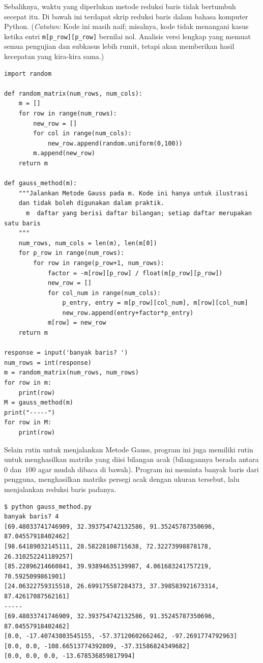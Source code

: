 Sebaliknya, waktu yang diperlukan metode reduksi baris tidak bertumbuh secepat itu.
Di bawah ini terdapat skrip reduksi baris dalam bahasa komputer Python.
(\textit{Catatan:}
Kode ini masih naif; misalnya, kode tidak menangani kasus ketika entri
\lstinline[style=inline]!m[p_row][p_row]! bernilai nol.
Analisis versi lengkap yang memuat semua pengujian dan subkasus lebih rumit,
tetapi akan memberikan hasil kecepatan yang kira-kira sama.)
\begin{lstlisting}
import random

def random_matrix(num_rows, num_cols):
    m = []
    for row in range(num_rows):
        new_row = []
        for col in range(num_cols):
            new_row.append(random.uniform(0,100))
        m.append(new_row)
    return m

def gauss_method(m):
    """Jalankan Metode Gauss pada m. Kode ini hanya untuk ilustrasi
    dan tidak boleh digunakan dalam praktik.
      m  daftar yang berisi daftar bilangan; setiap daftar merupakan satu baris
    """
    num_rows, num_cols = len(m), len(m[0])
    for p_row in range(num_rows):
        for row in range(p_row+1, num_rows):
            factor = -m[row][p_row] / float(m[p_row][p_row])
            new_row = []
            for col_num in range(num_cols): 
                p_entry, entry = m[p_row][col_num], m[row][col_num]
                new_row.append(entry+factor*p_entry)
            m[row] = new_row
    return m

response = input('banyak baris? ')
num_rows = int(response)
m = random_matrix(num_rows, num_rows)
for row in m:
    print(row)
M = gauss_method(m)
print("-----")
for row in M:
    print(row)
\end{lstlisting}
Selain rutin untuk menjalankan Metode Gauss, program ini juga memiliki rutin
untuk menghasilkan matriks yang diisi bilangan acak (bilangannya berada antara
$0$ dan~$100$ agar mudah dibaca di bawah).
Program ini meminta banyak baris dari pengguna, menghasilkan matriks persegi
acak dengan ukuran tersebut, lalu menjalankan reduksi baris padanya.
\begin{lstlisting}
$ python gauss_method.py
banyak baris? 4
[69.48033741746909, 32.393754742132586, 91.35245787350696, 87.04557918402462]
[98.64189032145111, 28.58228108715638, 72.32273998878178, 26.310252241189257]
[85.22896214660841, 39.93894635139987, 4.061683241757219, 70.5925099861901]
[24.06322759315518, 26.699175587284373, 37.398583921673314, 87.42617087562161]
-----
[69.48033741746909, 32.393754742132586, 91.35245787350696, 87.04557918402462]
[0.0, -17.40743803545155, -57.37120602662462, -97.2691774792963]
[0.0, 0.0, -108.66513774392809, -37.31586824349682]
[0.0, 0.0, 0.0, -13.678536859817994]
\end{lstlisting}  %

